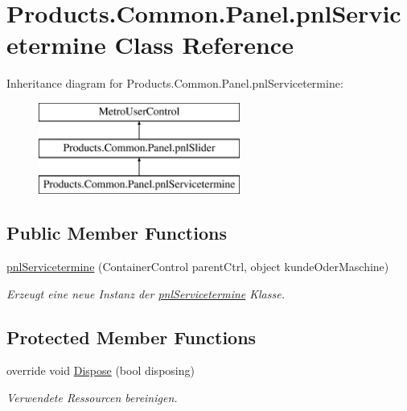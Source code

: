 \hypertarget{class_products_1_1_common_1_1_panel_1_1pnl_servicetermine}{}\section{Products.\+Common.\+Panel.\+pnl\+Servicetermine Class Reference}
\label{class_products_1_1_common_1_1_panel_1_1pnl_servicetermine}
Inheritance diagram for Products.\+Common.\+Panel.\+pnl\+Servicetermine\+:\begin{figure}[H]
\begin{center}
\leavevmode
\includegraphics[height=3.000000cm]{class_products_1_1_common_1_1_panel_1_1pnl_servicetermine}
\end{center}
\end{figure}
\subsection*{Public Member Functions}
\begin{DoxyCompactItemize}
\item 
\hyperlink{class_products_1_1_common_1_1_panel_1_1pnl_servicetermine_a4704d08022403f75698ae3d3d2fed452}{pnl\+Servicetermine} (Container\+Control parent\+Ctrl, object kunde\+Oder\+Maschine)
\begin{DoxyCompactList}\small\item\em Erzeugt eine neue Instanz der \hyperlink{class_products_1_1_common_1_1_panel_1_1pnl_servicetermine}{pnl\+Servicetermine} Klasse. \end{DoxyCompactList}\end{DoxyCompactItemize}
\subsection*{Protected Member Functions}
\begin{DoxyCompactItemize}
\item 
override void \hyperlink{class_products_1_1_common_1_1_panel_1_1pnl_servicetermine_abb61f8bce2847eb7d81d2b6ecf36e505}{Dispose} (bool disposing)
\begin{DoxyCompactList}\small\item\em Verwendete Ressourcen bereinigen. \end{DoxyCompactList}\end{DoxyCompactItemize}
